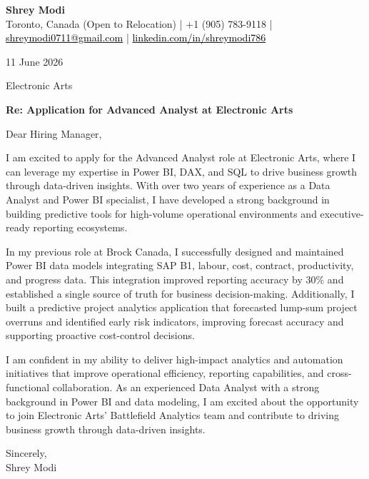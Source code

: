 \documentclass[11pt,letterpaper]{article}
\begin{document}
\begin{center}
  {\Large \bfseries \color{accent} Shrey Modi}\\[0.2em]
  {\small Toronto, Canada (Open to Relocation) | +1 (905) 783-9118 | \href{mailto:shreymodi0711@gmail.com}{\textcolor{black}{shreymodi0711@gmail.com}} | \href{https://linkedin.com/in/shreymodi786}{\textcolor{black}{linkedin.com/in/shreymodi786}}}
\end{center}

\vspace{1em}

11 June 2026

\vspace{0.5em}

Electronic Arts\\
\vspace{0.5em}

\textbf{Re: Application for Advanced Analyst at Electronic Arts}

Dear Hiring Manager,

I am excited to apply for the Advanced Analyst role at Electronic Arts, where I can leverage my expertise in Power BI, DAX, and SQL to drive business growth through data-driven insights. With over two years of experience as a Data Analyst and Power BI specialist, I have developed a strong background in building predictive tools for high-volume operational environments and executive-ready reporting ecosystems.

In my previous role at Brock Canada, I successfully designed and maintained Power BI data models integrating SAP B1, labour, cost, contract, productivity, and progress data. This integration improved reporting accuracy by 30\% and established a single source of truth for business decision-making. Additionally, I built a predictive project analytics application that forecasted lump-sum project overruns and identified early risk indicators, improving forecast accuracy and supporting proactive cost-control decisions.

I am confident in my ability to deliver high-impact analytics and automation initiatives that improve operational efficiency, reporting capabilities, and cross-functional collaboration. As an experienced Data Analyst with a strong background in Power BI and data modeling, I am excited about the opportunity to join Electronic Arts' Battlefield Analytics team and contribute to driving business growth through data-driven insights.

Sincerely,\\
Shrey Modi
\end{document}
